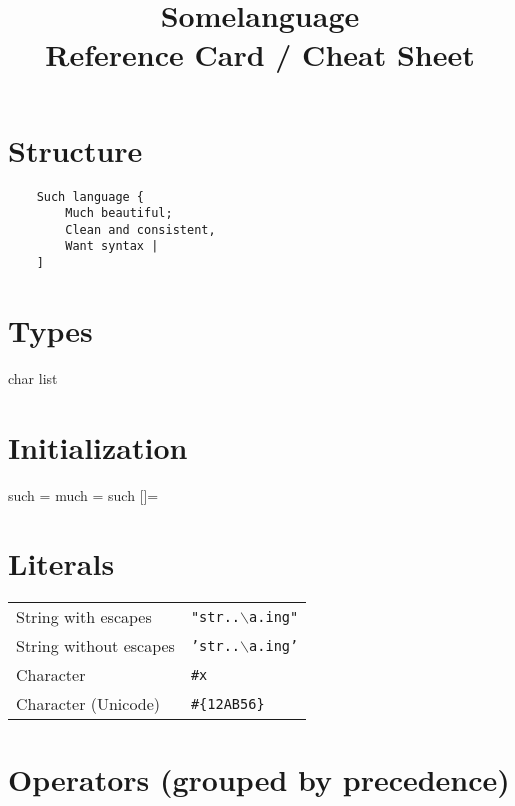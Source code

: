 \documentclass{refcard}
\title{Somelanguage\\Reference Card / Cheat Sheet}
\begin{document}
\maketitle

\section{Structure}

\begin{verbatim}
	Such language {
	    Much beautiful;
	    Clean and consistent,
	    Want syntax |
	]
\end{verbatim}

\section{Types}

\begin{ldesc}
	   {char   }
	   {list   }
\end{ldesc}

\section{Initialization}

\begin{ldesc}
	   {such  =           }
	  {much  =           }
	            {such  []= }
\end{ldesc}

\section{Literals}

\begin{tabular}{ll}
	String with escapes    & \texttt{"str..$\backslash{}$a.ing"} \\
	String without escapes & \texttt{'str..$\backslash{}$a.ing'} \\
	Character              & \texttt{\#x} \\
	Character (Unicode)    & \texttt{\#\{12AB56\}} \\
\end{tabular}

\section{Operators (grouped by precedence)}
\end{document}
